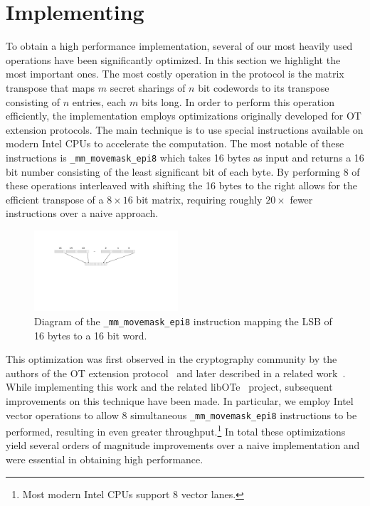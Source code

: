 
\section{Implementing}

To obtain a high performance implementation, several of our most heavily used operations have been significantly optimized. In this section we highlight the most important ones. The most costly operation in the \cite{DBLP:conf/tcc/FrederiksenJNT16} protocol is the matrix transpose that maps $m$ secret sharings of $n$ bit codewords to its transpose consisting of $n$ entries, each $m$ bits long. In order to perform this operation efficiently, the implementation employs optimizations originally developed for OT extension protocols. The main technique is to use special instructions available on modern Intel CPUs to accelerate the computation. The most notable of these instructions is \texttt{\_mm\_movemask\_epi8} which takes 16 bytes as input and returns a 16 bit number consisting of the least significant bit of each byte. By performing 8 of these operations interleaved with shifting the 16 bytes to the right allows for the efficient transpose of a $8\times 16$ bit matrix, requiring roughly $20\times$ fewer instructions over a naive approach.

\begin{figure}[h]
	\centering
\includegraphics[height=3cm,trim={2cm 10.5cm 7cm 3cm},clip]{dgrm}
\caption{Diagram of the \texttt{\_mm\_movemask\_epi8} instruction mapping the LSB of 16 bytes to a 16 bit word.}
\end{figure}
This optimization was first observed in the cryptography community by the authors of the OT extension protocol~\cite{DBLP:conf/crypto/KellerOS15} and later described in a related work~\cite{DBLP:conf/ccs/KellerOS16}. While implementing this work and the related libOTe~\cite{libOTe} project, subsequent improvements on this technique have been made. In particular, we employ Intel vector operations to allow 8 simultaneous \texttt{\_mm\_movemask\_epi8} instructions to be performed, resulting in even greater throughput.\footnote{Most modern Intel CPUs support 8 vector lanes.} In total these optimizations yield several orders of magnitude improvements over a naive implementation and were essential in obtaining high performance.


